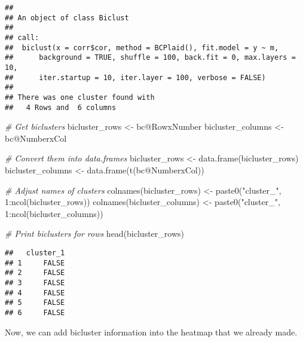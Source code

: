 \documentclass[
  oneside]{book}
\newenvironment{Shaded}{\begin{snugshade}}{\end{snugshade}}
\newcommand{\CommentTok}[1]{\textcolor[rgb]{0.56,0.35,0.01}{\textit{#1}}}
\newcommand{\DecValTok}[1]{\textcolor[rgb]{0.00,0.00,0.81}{#1}}
\newcommand{\FunctionTok}[1]{\textcolor[rgb]{0.00,0.00,0.00}{#1}}
\newcommand{\NormalTok}[1]{#1}
\newcommand{\OtherTok}[1]{\textcolor[rgb]{0.56,0.35,0.01}{#1}}
\newcommand{\SpecialCharTok}[1]{\textcolor[rgb]{0.00,0.00,0.00}{#1}}
\newcommand{\StringTok}[1]{\textcolor[rgb]{0.31,0.60,0.02}{#1}}
\begin{document}
\begin{verbatim}
## 
## An object of class Biclust 
## 
## call:
##  biclust(x = corr$cor, method = BCPlaid(), fit.model = y ~ m, 
##      background = TRUE, shuffle = 100, back.fit = 0, max.layers = 10, 
##      iter.startup = 10, iter.layer = 100, verbose = FALSE)
## 
## There was one cluster found with
##   4 Rows and  6 columns
\end{verbatim}

\begin{Shaded}
\begin{Highlighting}[]
\CommentTok{\# Get biclusters}
\NormalTok{bicluster\_rows }\OtherTok{\textless{}{-}}\NormalTok{ bc}\SpecialCharTok{@}\NormalTok{RowxNumber}
\NormalTok{bicluster\_columns }\OtherTok{\textless{}{-}}\NormalTok{ bc}\SpecialCharTok{@}\NormalTok{NumberxCol}

\CommentTok{\# Convert them into data.frames}
\NormalTok{bicluster\_rows }\OtherTok{\textless{}{-}} \FunctionTok{data.frame}\NormalTok{(bicluster\_rows)}
\NormalTok{bicluster\_columns }\OtherTok{\textless{}{-}} \FunctionTok{data.frame}\NormalTok{(}\FunctionTok{t}\NormalTok{(bc}\SpecialCharTok{@}\NormalTok{NumberxCol))}

\CommentTok{\# Adjust names of clusters}
\FunctionTok{colnames}\NormalTok{(bicluster\_rows) }\OtherTok{\textless{}{-}} \FunctionTok{paste0}\NormalTok{(}\StringTok{"cluster\_"}\NormalTok{, }\DecValTok{1}\SpecialCharTok{:}\FunctionTok{ncol}\NormalTok{(bicluster\_rows))}
\FunctionTok{colnames}\NormalTok{(bicluster\_columns) }\OtherTok{\textless{}{-}} \FunctionTok{paste0}\NormalTok{(}\StringTok{"cluster\_"}\NormalTok{, }\DecValTok{1}\SpecialCharTok{:}\FunctionTok{ncol}\NormalTok{(bicluster\_columns))}

\CommentTok{\# Print biclusters for rows}
\FunctionTok{head}\NormalTok{(bicluster\_rows)}
\end{Highlighting}
\end{Shaded}

\begin{verbatim}
##   cluster_1
## 1     FALSE
## 2     FALSE
## 3     FALSE
## 4     FALSE
## 5     FALSE
## 6     FALSE
\end{verbatim}

Now, we can add bicluster information into the heatmap that we already made.
\end{document}
